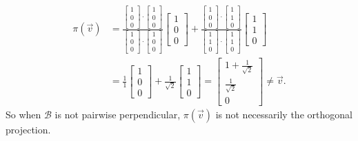 \documentclass[12pt]{exam}
\begin{document}
\begin{questions}
\begin{parts}
\begin{solution}
\begin{align*}
					\pi(\vec v) &= \frac{\begin{bmatrix}1 \\ 0 \\ 0\end{bmatrix} \cdot \begin{bmatrix}1 \\ 0 \\ 0\end{bmatrix}}{\begin{bmatrix}1 \\ 0 \\ 0\end{bmatrix} \cdot \begin{bmatrix}1 \\ 0 \\ 0\end{bmatrix}}\begin{bmatrix}1 \\ 0 \\ 0\end{bmatrix} + \frac{\begin{bmatrix}1 \\ 0 \\ 0\end{bmatrix} \cdot \begin{bmatrix}1 \\ 1 \\ 0\end{bmatrix}}{\begin{bmatrix}1 \\ 1 \\ 0\end{bmatrix} \cdot \begin{bmatrix}1 \\ 1 \\ 0\end{bmatrix}}\begin{bmatrix}1 \\ 1 \\ 0\end{bmatrix} \\
					&= \frac{1}{1}\begin{bmatrix}1 \\ 0 \\ 0\end{bmatrix} + \frac{1}{\sqrt{2}}\begin{bmatrix}1 \\ 1 \\ 0\end{bmatrix} = \begin{bmatrix}1 + \frac{1}{\sqrt2} \\ \frac{1}{\sqrt2} \\ 0\end{bmatrix} \neq \vec v.
				\end{align*}
				So when $\mathcal B$ is not pairwise perpendicular, $\pi(\vec v)$ is not necessarily the orthogonal projection.
			\end{solution}
	\end{parts}
\clearpage


\end{questions}
\end{document}
